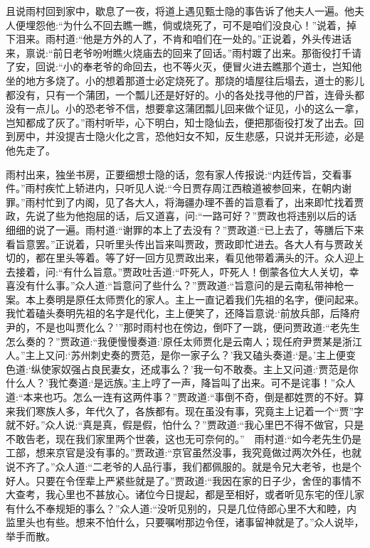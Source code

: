 \begin{parag}
    且说雨村回到家中，歇息了一夜，将道上遇见甄士隐的事告诉了他夫人一遍。他夫人便埋怨他:“为什么不回去瞧一瞧，倘或烧死了，可不是咱们没良心！”说着，掉下泪来。雨村道:“他是方外的人了，不肯和咱们在一处的。”正说着，外头传进话来，禀说:“前日老爷吩咐瞧火烧庙去的回来了回话。”雨村踱了出来。那衙役打千请了安，回说:“小的奉老爷的命回去，也不等火灭，便冒火进去瞧那个道士，岂知他坐的地方多烧了。小的想着那道士必定烧死了。那烧的墙屋往后塌去，道士的影儿都没有，只有一个蒲团，一个瓢儿还是好好的。小的各处找寻他的尸首，连骨头都没有一点儿。小的恐老爷不信，想要拿这蒲团瓢儿回来做个证见，小的这么一拿，岂知都成了灰了。”雨村听毕，心下明白，知士隐仙去，便把那衙役打发了出去。回到房中，并没提吉士隐火化之言，恐他妇女不知，反生悲感，只说并无形迹，必是他先走了。
\end{parag}


\begin{parag}
    雨村出来，独坐书房，正要细想士隐的话，忽有家人传报说:“内廷传旨，交看事件。”雨村疾忙上轿进内，只听见人说:“今日贾存周江西粮道被参回来，在朝内谢罪。”雨村忙到了内阁，见了各大人，将海疆办理不善的旨意看了，出来即忙找着贾政，先说了些为他抱屈的话，后又道喜，问:“一路可好？”贾政也将违别以后的话细细的说了一遍。雨村道:“谢罪的本上了去没有？”贾政道:“已上去了，等膳后下来看旨意罢。”正说着，只听里头传出旨来叫贾政，贾政即忙进去。各大人有与贾政关切的，都在里头等着。等了好一回方见贾政出来，看见他带着满头的汗。众人迎上去接着，问:“有什么旨意。”贾政吐舌道:“吓死人，吓死人！倒蒙各位大人关切，幸喜没有什么事。”众人道:“旨意问了些什么？”贾政道:“旨意问的是云南私带神枪一案。本上奏明是原任太师贾化的家人。主上一直记着我们先祖的名字，便问起来。我忙着磕头奏明先祖的名字是代化，主上便笑了，还降旨意说:‘前放兵部，后降府尹的，不是也叫贾化么？’”那时雨村也在傍边，倒吓了一跳，便问贾政道:“老先生怎么奏的？”贾政道:“我便慢慢奏道:’原任太师贾化是云南人；现任府尹贾某是浙江人。”主上又问:‘苏州刺史奏的贾范，是你一家子么？’我又磕头奏道:‘是。’主上便变色道:‘纵使家奴强占良民妻女，还成事么？’我一句不敢奏。主上又问道:‘贾范是你什么人？’我忙奏道:‘是远族。’主上哼了一声，降旨叫了出来。可不是诧事！”众人道:“本来也巧。怎么一连有这两件事？”贾政道:“事倒不奇，倒是都姓贾的不好。算来我们寒族人多，年代久了，各族都有。现在虽没有事，究竟主上记着一个“贾”字就不好。”众人说:“真是真，假是假，怕什么？”贾政道:“我心里巴不得不做官，只是不敢告老，现在我们家里两个世袭，这也无可奈何的。”　雨村道:“如今老先生仍是工部，想来京官是没有事的。”贾政道:“京官虽然没事，我究竟做过两次外任，也就说不齐了。”众人道:“二老爷的人品行事，我们都佩服的。就是令兄大老爷，也是个好人。只要在令侄辈上严紧些就是了。”贾政道:“我因在家的日子少，舍侄的事情不大查考，我心里也不甚放心。诸位今日提起，都是至相好，或者听见东宅的侄儿家有什么不奉规矩的事么？”众人道:“没听见别的，只是几位侍郎心里不大和睦，内监里头也有些。想来不怕什么，只要嘱咐那边令侄，诸事留神就是了。”众人说毕，举手而散。
\end{parag}


